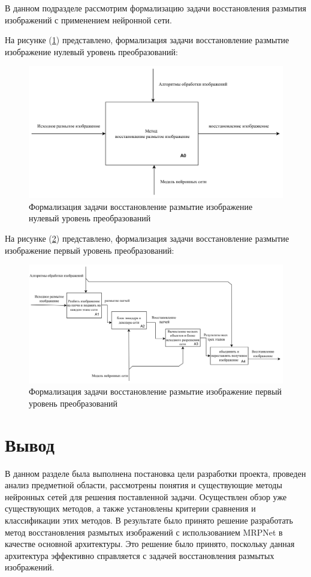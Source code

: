 В данном подразделе рассмотрим формализацию задачи восстановления размытия изображений с применением нейронной сети.

На рисунке (\ref{fig:method-desc-a0}) представлено, формализация задачи восстановление размытие изображение нулевый уровень преобразований: 
\begin{figure}[H]
	\centering
	\includegraphics[width=1\linewidth]{assets/idef0-A0.png}
	\caption{Формализация задачи восстановление размытие изображение нулевый уровень преобразований}
	\label{fig:method-desc-a0}
\end{figure}


На рисунке (\ref{fig:method-desc-a1}) представлено, формализация задачи восстановление размытие изображение первый уровень преобразований: 
\begin{figure}[H]
	\centering
	\includegraphics[width=1\linewidth]{assets/idef0-A1.png}
	\caption{Формализация задачи восстановление размытие изображение первый уровень преобразований}
	\label{fig:method-desc-a1}
\end{figure}

\section*{Вывод}

В данном разделе была выполнена постановка цели разработки проекта, проведен анализ предметной области, рассмотрены понятия и существующие методы нейронных сетей для решения поставленной задачи. Осуществлен обзор уже существующих методов, а также установлены критерии сравнения и классификации этих методов. В результате было принято решение разработать метод восстановления размытых изображений с использованием MRPNet в качестве основной архитектуры. Это решение было принято, поскольку данная архитектура эффективно справляется с задачей восстановления размытых изображений.